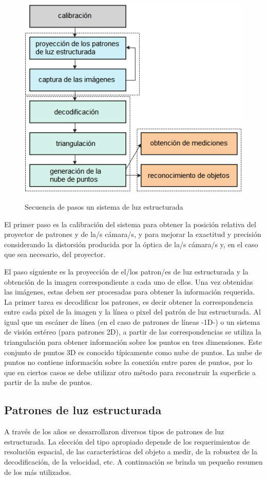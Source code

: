 \begin{figure}[bth]
    \myfloatalign
        {\includegraphics[width=0.8\linewidth]{images/structuredLightSequence}}
        \caption{Secuencia de pasos un sistema de luz estructurada}
        \label{fig:structuredLightSequence}
\end{figure}

El primer paso es la calibración del sistema para obtener la posición relativa del proyector de patrones y de la/s cámara/s, y para mejorar la exactitud y precisión considerando la distorsión producida por la óptica de la/s cámara/s y, en el caso que sea necesario, del proyector.

El paso siguiente es la proyección de el/los patron/es de luz estructurada y la obtención de la imagen correspondiente a cada uno de ellos. Una vez obtenidas las imágenes, estas deben ser procesadas para obtener la información requerida. La primer tarea es decodificar los patrones, es decir obtener la correspondencia entre cada pixel de la imagen y la línea o pixel del patrón de luz estructurada. Al igual que un escáner de línea (en el caso de patrones de líneas -1D-) o un sistema de visión estéreo (para patrones 2D), a partir de las correspondencias se utiliza la triangulación para obtener información sobre los puntos en tres dimensiones. Este conjunto de puntos 3D es conocido típicamente como nube de puntos. La nube de puntos no contiene información sobre la conexión entre pares de puntos, por lo que en ciertos casos se debe utilizar otro método para reconstruir la superficie a partir de la nube de puntos.

\subsection{Patrones de luz estructurada}
A través de los años se desarrollaron diversos tipos de patrones de luz estructurada. La elección del tipo apropiado depende de los requerimientos de resolución espacial, de las características del objeto a medir, de la robustez de la decodificación, de la velocidad, etc. A continuación se brinda un pequeño resumen de los más utilizados.

